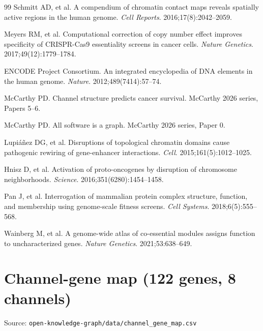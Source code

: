 \documentclass[11pt]{article}
\theoremstyle{definition}
\begin{document}
\begin{thebibliography}{99}
Schmitt AD, et al. A compendium of chromatin contact maps reveals spatially active regions in the human genome. \emph{Cell Reports}. 2016;17(8):2042--2059.

Meyers RM, et al. Computational correction of copy number effect improves specificity of CRISPR-Cas9 essentiality screens in cancer cells. \emph{Nature Genetics}. 2017;49(12):1779--1784.

ENCODE Project Consortium. An integrated encyclopedia of DNA elements in the human genome. \emph{Nature}. 2012;489(7414):57--74.

McCarthy PD. Channel structure predicts cancer survival. McCarthy 2026 series, Papers 5--6.

McCarthy PD. All software is a graph. McCarthy 2026 series, Paper 0.

Lupi\'{a}\~{n}ez DG, et al. Disruptions of topological chromatin domains cause pathogenic rewiring of gene-enhancer interactions. \emph{Cell}. 2015;161(5):1012--1025.

Hnisz D, et al. Activation of proto-oncogenes by disruption of chromosome neighborhoods. \emph{Science}. 2016;351(6280):1454--1458.

Pan J, et al. Interrogation of mammalian protein complex structure, function, and membership using genome-scale fitness screens. \emph{Cell Systems}. 2018;6(5):555--568.

Wainberg M, et al. A genome-wide atlas of co-essential modules assigns function to uncharacterized genes. \emph{Nature Genetics}. 2021;53:638--649.

\end{thebibliography}

\appendix

\section{Channel-gene map (122 genes, 8 channels)}

Source: \texttt{open-knowledge-graph/data/channel\_gene\_map.csv}
\end{document}
